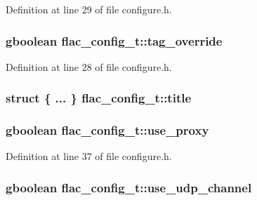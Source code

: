 Definition at line 29 of file configure.\+h.

\subsubsection[{\texorpdfstring{tag\+\_\+override}{tag_override}}]{\setlength{\rightskip}{0pt plus 5cm}gboolean flac\+\_\+config\+\_\+t\+::tag\+\_\+override}\hypertarget{structflac__config__t_a1108c9746f8d452fc951b10dcdfb84d0}{}\label{structflac__config__t_a1108c9746f8d452fc951b10dcdfb84d0}


Definition at line 28 of file configure.\+h.

\subsubsection[{\texorpdfstring{title}{title}}]{\setlength{\rightskip}{0pt plus 5cm}struct \{ ... \}   flac\+\_\+config\+\_\+t\+::title}\hypertarget{structflac__config__t_a606d92e0f1f5a674fbffc6045fa4518a}{}\label{structflac__config__t_a606d92e0f1f5a674fbffc6045fa4518a}
\subsubsection[{\texorpdfstring{use\+\_\+proxy}{use_proxy}}]{\setlength{\rightskip}{0pt plus 5cm}gboolean flac\+\_\+config\+\_\+t\+::use\+\_\+proxy}\hypertarget{structflac__config__t_a10cb8c3576c322a9dae1d4ebc6401446}{}\label{structflac__config__t_a10cb8c3576c322a9dae1d4ebc6401446}


Definition at line 37 of file configure.\+h.

\subsubsection[{\texorpdfstring{use\+\_\+udp\+\_\+channel}{use_udp_channel}}]{\setlength{\rightskip}{0pt plus 5cm}gboolean flac\+\_\+config\+\_\+t\+::use\+\_\+udp\+\_\+channel}\hypertarget{structflac__config__t_a563a04bfa6c637daaccb11499a41cae7}{}\label{structflac__config__t_a563a04bfa6c637daaccb11499a41cae7}


